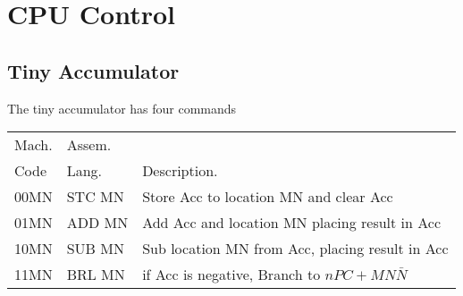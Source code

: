 \chapter{CPU Control}
\label{c-cpu}

\section{Tiny Accumulator}
\TinyAcc


The tiny accumulator has four commands

\begin{tabular}{lll}
Mach.  & Assem. & \\
Code   & Lang.  & Description. \\\hline
  00MN & STC MN & Store Acc to location MN and clear Acc \\
  01MN & ADD MN & Add Acc and location MN placing result in Acc \\
  10MN & SUB MN & Sub location MN from Acc, placing result in Acc \\
  11MN & BRL MN & if Acc is negative, Branch to $nPC+MN\bar N$ \\
\end{tabular}

